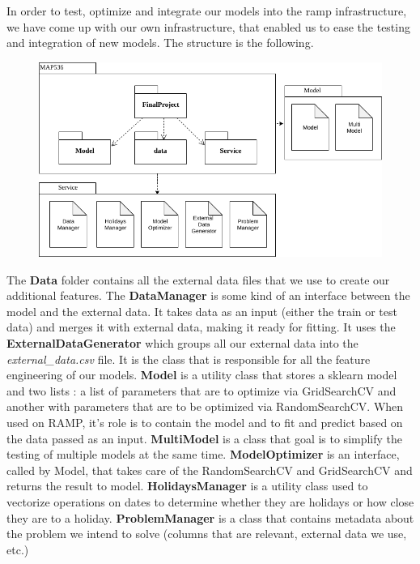 \documentclass[a4paper,12pt,twoside]{article}
\begin{document}
In order to test, optimize and integrate our models into the ramp infrastructure, we have come up with our own infrastructure, that enabled us to ease the testing and integration of new models. The structure is the following.

\begin{figure}[H]
	\centering
	\includegraphics[scale=0.4]{UML.png}
\end{figure}

The \textbf{Data} folder contains all the external data files that we use to create our additional features. The \textbf{DataManager} is some kind of an interface between the model and the external data. It takes data as an input (either the train or test data) and merges it with external data, making it ready for fitting. It uses the \textbf{ExternalDataGenerator} which groups all our external data into the \textit{external\_data.csv} file. It is the class that is responsible for all the feature engineering of our models. \textbf{Model} is a utility class that stores a sklearn model and two lists : a list of parameters that are to optimize via GridSearchCV and another with parameters that are to be optimized via RandomSearchCV. When used on RAMP, it's role is to contain the model and to fit and predict based on the data passed as an input. \textbf{MultiModel} is a class that goal is to simplify the testing of multiple models at the same time. \textbf{ModelOptimizer} is an interface, called by Model, that takes care of the RandomSearchCV and GridSearchCV and returns the result to model. \textbf{HolidaysManager} is a utility class used to vectorize operations on dates to determine whether they are holidays or how close they are to a holiday. \textbf{ProblemManager} is a class that contains metadata about the problem we intend to solve (columns that are relevant, external data we use, etc.)
\end{document}
